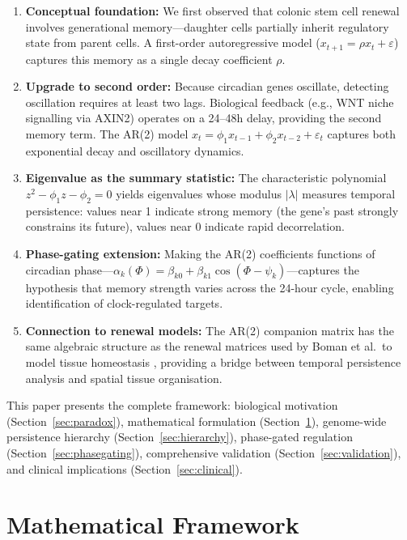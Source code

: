 \documentclass[11pt,letterpaper]{article}
\begin{document}
\begin{enumerate}
\item \textbf{Conceptual foundation:} We first observed that colonic stem cell renewal involves generational memory---daughter cells partially inherit regulatory state from parent cells. A first-order autoregressive model ($x_{t+1} = \rho x_t + \varepsilon$) captures this memory as a single decay coefficient $\rho$.
\item \textbf{Upgrade to second order:} Because circadian genes oscillate, detecting oscillation requires at least two lags. Biological feedback (e.g., WNT niche signalling via AXIN2) operates on a 24--48h delay, providing the second memory term. The AR(2) model $x_t = \phi_1 x_{t-1} + \phi_2 x_{t-2} + \varepsilon_t$ captures both exponential decay and oscillatory dynamics.
\item \textbf{Eigenvalue as the summary statistic:} The characteristic polynomial $z^2 - \phi_1 z - \phi_2 = 0$ yields eigenvalues whose modulus $|\lambda|$ measures temporal persistence: values near 1 indicate strong memory (the gene's past strongly constrains its future), values near 0 indicate rapid decorrelation.
\item \textbf{Phase-gating extension:} Making the AR(2) coefficients functions of circadian phase---$\alpha_k(\Phi) = \beta_{k0} + \beta_{k1}\cos(\Phi - \psi_k)$---captures the hypothesis that memory strength varies across the 24-hour cycle, enabling identification of clock-regulated targets.
\item \textbf{Connection to renewal models:} The AR(2) companion matrix has the same algebraic structure as the renewal matrices used by Boman et al.\ to model tissue homeostasis \citep{boman2017fibonacci}, providing a bridge between temporal persistence analysis and spatial tissue organisation.
\end{enumerate}

This paper presents the complete framework: biological motivation (Section~\ref{sec:paradox}), mathematical formulation (Section~\ref{sec:methods}), genome-wide persistence hierarchy (Section~\ref{sec:hierarchy}), phase-gated regulation (Section~\ref{sec:phasegating}), comprehensive validation (Section~\ref{sec:validation}), and clinical implications (Section~\ref{sec:clinical}).


\section{Mathematical Framework}
\label{sec:methods}
\end{document}
